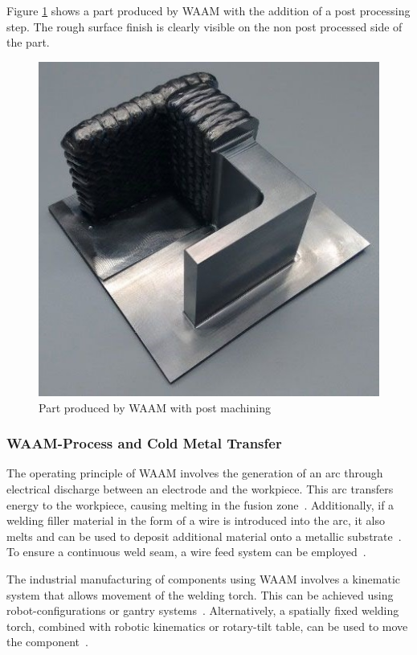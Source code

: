 Figure \ref{WAAMba} shows a part produced by WAAM with the addition of a post processing step. The rough surface finish is clearly visible on the non post processed side of the part.

\begin{figure}[H]
	\centerline{\includegraphics[scale=.8]{figures/WAAMba.jpg}}
	\caption{Part produced by WAAM with post machining \cite{WAAMba}}
	\label{WAAMba}
\end{figure}

\subsubsection{WAAM-Process and Cold Metal Transfer}
The operating principle of WAAM involves the generation of an arc through electrical discharge between an electrode and the workpiece. This arc transfers energy to the workpiece, causing melting in the fusion zone~\cite{Ou.2018}. Additionally, if a welding filler material in the form of a wire is introduced into the arc, it also melts and can be used to deposit additional material onto a metallic substrate~\cite{Cunningham.2018}. To ensure a continuous weld seam, a wire feed system can be employed~\cite{Ding.2015}.

The industrial manufacturing of components using WAAM involves a kinematic system that allows movement of the welding torch. This can be achieved using robot-configurations or gantry systems~\cite{Schmitz.2021}. Alternatively, a spatially fixed welding torch, combined with robotic kinematics or rotary-tilt table, can be used to move the component~\cite{Nagasai.2022}. %


